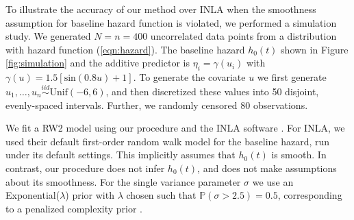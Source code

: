 \documentclass[]{article}
\begin{document}
To illustrate the accuracy of our method over INLA when the smoothness assumption for baseline hazard function is violated, we performed a simulation study. We generated $N = n = 400$ uncorrelated data points from a distribution with hazard function (\ref{eqn:hazard}). The baseline hazard $h_{0}(t)$ shown in Figure \ref{fig:simulation} and the additive predictor is $\eta_{i} = \gamma\left(u_{i}\right)$ with $\gamma(u) = 1.5 [ \text{sin}(0.8u) + 1 ]$. To generate the covariate $u$ we first generate $u_{1},\ldots,u_{n}\overset{iid}{\sim}\text{Unif}(-6,6)$, and then discretized these values into 50 disjoint, evenly-spaced intervals. Further, we randomly censored $80$ observations. 

We fit a RW2 model using our procedure and the INLA software \citep{inla}. For INLA, we used their default first-order random walk model for the baseline hazard, run under its default settings. This implicitly assumes that $h_{0}(t)$ is smooth. In contrast, our procedure does not infer $h_{0}(t)$, and does not make assumptions about its smoothness. For the single variance parameter $\sigma$ we use an Exponential($\lambda$) prior with $\lambda$ chosen such that $\mathbb{P}\left( \sigma > 2.5\right) = 0.5$, corresponding to a penalized complexity prior \citep{pcprior}.
\end{document}
